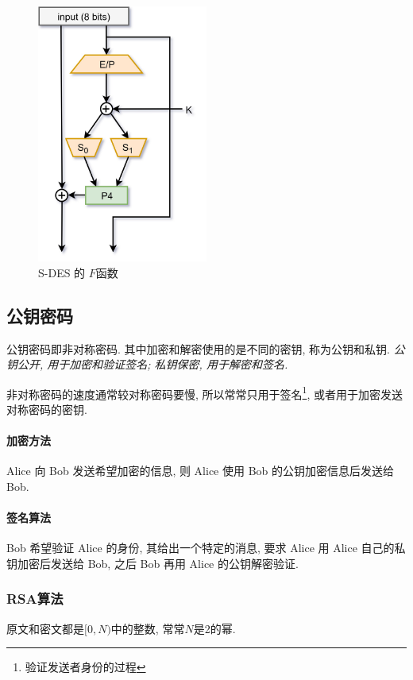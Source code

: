 \documentclass{ctexart}
\begin{document}
    \begin{figure}[ht!]
        \centering
        \includegraphics[height=0.5\textheight,width=0.5\textwidth,keepaspectratio]{s-des-fk.jpg}
        \caption{S-DES 的 $F$函数}
        \label{s-des-fk}
    \end{figure}

\subsection{公钥密码}
    公钥密码即非对称密码.
    其中加密和解密使用的是不同的密钥, 称为公钥和私钥.
    \emph{公钥公开, 用于加密和验证签名; 私钥保密, 用于解密和签名.}\par
    非对称密码的速度通常较对称密码要慢,
    所以常常只用于签名\footnote{验证发送者身份的过程},
    或者用于加密发送对称密码的密钥.
\paragraph{加密方法} Alice 向 Bob 发送希望加密的信息, 则 Alice 使用 Bob 的公钥加密信息后发送给 Bob.
\paragraph{签名算法} Bob 希望验证 Alice 的身份,
    其给出一个特定的消息, 要求 Alice 用 Alice 自己的私钥加密后发送给 Bob,
    之后 Bob 再用 Alice 的公钥解密验证.
\subsubsection{RSA算法}
    原文和密文都是$[0, N)$中的整数, 常常$N$是2的幂.\par
\end{document}
